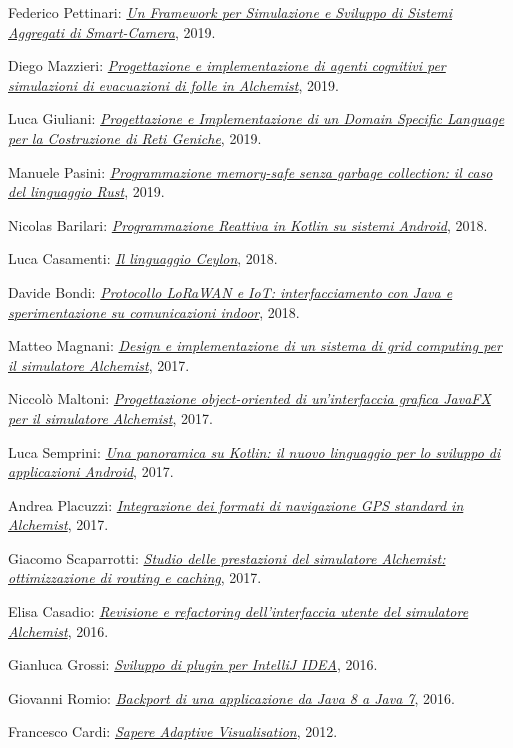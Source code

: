\begin{innerlist}
    \item Federico Pettinari: \href{https://amslaurea.unibo.it/19092/}{\textit{Un Framework per Simulazione e Sviluppo di Sistemi Aggregati di Smart-Camera}}, 2019.
    \item Diego Mazzieri: \href{https://amslaurea.unibo.it/19084/}{\textit{Progettazione e implementazione di agenti cognitivi per simulazioni di evacuazioni di folle in Alchemist}}, 2019.
    \item Luca Giuliani: \href{https://amslaurea.unibo.it/19071/}{\textit{Progettazione e Implementazione di un Domain Specific Language per la Costruzione di Reti Geniche}}, 2019.
    \item Manuele Pasini: \href{http://amslaurea.unibo.it/18535/}{\textit{Programmazione memory-safe senza garbage collection: il caso del linguaggio Rust}}, 2019.
    \item Nicolas Barilari: \href{http://amslaurea.unibo.it/16841/}{\textit{Programmazione Reattiva in Kotlin su sistemi Android}}, 2018.
    \item Luca Casamenti: \href{http://amslaurea.unibo.it/16788/}{\textit{Il linguaggio Ceylon}}, 2018.
    \item Davide Bondi: \href{http://amslaurea.unibo.it/15730/}{\textit{Protocollo LoRaWAN e IoT: interfacciamento con Java e sperimentazione su comunicazioni indoor}}, 2018.
    \item Matteo Magnani: \href{http://amslaurea.unibo.it/17133/}{\textit{Design e implementazione di un sistema di grid computing per il simulatore Alchemist}}, 2017.
    \item Niccolò Maltoni: \href{http://amslaurea.unibo.it/14682/}{\textit{Progettazione object-oriented di un'interfaccia grafica JavaFX per il simulatore Alchemist}}, 2017.
    \item Luca Semprini: \href{http://amslaurea.unibo.it/14673/}{\textit{Una panoramica su Kotlin: il nuovo linguaggio per lo sviluppo di applicazioni Android}}, 2017.
    \item Andrea Placuzzi: \href{http://amslaurea.unibo.it/14329/}{\textit{Integrazione dei formati di navigazione GPS standard in Alchemist}}, 2017.
    \item Giacomo Scaparrotti: \href{http://amslaurea.unibo.it/14019/}{\textit{Studio delle prestazioni del simulatore Alchemist: ottimizzazione di routing e caching}}, 2017.
    \item Elisa Casadio: \href{http://amslaurea.unibo.it/12310/}{\textit{Revisione e refactoring dell'interfaccia utente del simulatore Alchemist}}, 2016.
    \item Gianluca Grossi: \href{http://amslaurea.unibo.it/12503/}{\textit{Sviluppo di plugin per IntelliJ IDEA}}, 2016.
    \item Giovanni Romio: \href{http://amslaurea.unibo.it/10481/}{\textit{Backport di una applicazione da Java 8 a Java 7}}, 2016.
    \item Francesco Cardi: \href{http://archive.fo/zMGo8}{\textit{Sapere Adaptive Visualisation}}, 2012.
\end{innerlist}

